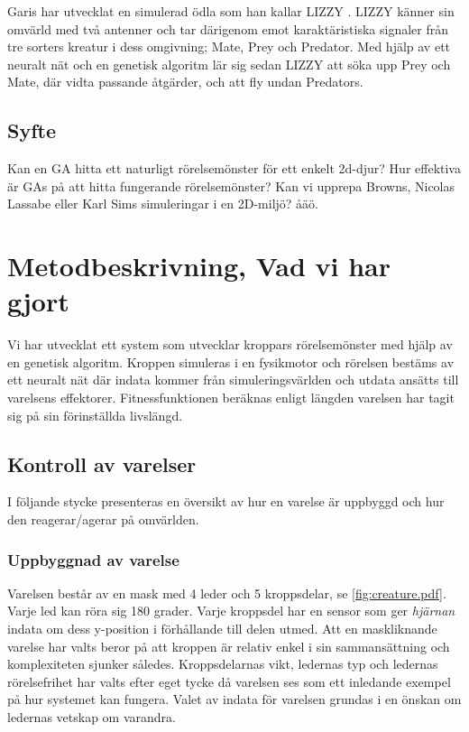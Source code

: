 \documentclass[titlepage, twocolumn, a4paper, 12pt]{article}
\begin{document}
Garis har utvecklat en simulerad ödla som han kallar LIZZY \cite{garis}. LIZZY känner sin omvärld med två antenner och tar därigenom emot karaktäristiska signaler från tre sorters kreatur i dess omgivning; Mate, Prey och Predator. Med hjälp av ett neuralt nät och en genetisk algoritm lär sig sedan LIZZY att söka upp Prey och Mate, där vidta passande åtgärder, och att fly undan Predators.

\subsection{Syfte}

Kan en GA hitta ett naturligt rörelsemönster för ett enkelt 2d-djur? 
Hur effektiva är GAs på att hitta fungerande rörelsemönster? 
Kan vi upprepa Browns, Nicolas Lassabe eller Karl Sims simuleringar i en 
2D-miljö? åäö.


\section{Metodbeskrivning, Vad vi har gjort}
Vi har utvecklat ett system som utvecklar kroppars rörelsemönster med hjälp av en genetisk algoritm. Kroppen simuleras i en fysikmotor och rörelsen bestäms av ett neuralt nät där indata kommer från simuleringsvärlden och utdata ansätts till varelsens effektorer. Fitnessfunktionen beräknas enligt längden varelsen har tagit sig på sin förinställda livslängd.


\subsection{Kontroll av varelser}
I följande stycke presenteras en översikt av hur en varelse är uppbyggd och hur den reagerar/agerar på omvärlden.

\subsubsection{Uppbyggnad av varelse}\label{sec:uppbyggnadVarelse}
Varelsen består av en mask med 4 leder och 5 kroppsdelar, se \ref{fig:creature.pdf}. Varje led kan röra sig 180 grader. Varje kroppsdel har en sensor som ger \textit{hjärnan} indata om dess y-position i förhållande till delen utmed. Att en maskliknande varelse har valts beror på att kroppen är relativ enkel i sin sammansättning och komplexiteten sjunker således. Kroppsdelarnas vikt, ledernas typ och ledernas rörelsefrihet har valts efter eget tycke då varelsen ses som ett inledande exempel på hur systemet kan fungera. Valet av indata för varelsen grundas i en önskan om ledernas vetskap om varandra.
\end{document}

